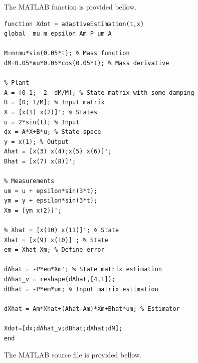 \documentclass[12pt]{article}
\begin{document}
The MATLAB function is provided bellow.
\begin{lstlisting}
function Xdot = adaptiveEstimation(t,x)
global  mu m epsilon Am P um A

M=m+mu*sin(0.05*t); % Mass function
dM=0.05*mu*0.05*cos(0.05*t); % Mass derivative

% Plant
A = [0 1; -2 -dM/M]; % State matrix with some damping
B = [0; 1/M]; % Input matrix
X = [x(1) x(2)]'; % States
u = 2*sin(t); % Input
dx = A*X+B*u; % State space 
y = x(1); % Output
Ahat = [x(3) x(4);x(5) x(6)]'; 
Bhat = [x(7) x(8)]';

% Measurements
um = u + epsilon*sin(3*t);
ym = y + epsilon*sin(3*t);
Xm = [ym x(2)]';

% Xhat = [x(10) x(11)]'; % State 
Xhat = [x(9) x(10)]'; % State 
em = Xhat-Xm; % Define error

dAhat = -P*em*Xm'; % State matrix estimation
dAhat_v = reshape(dAhat,[4,1]);
dBhat = -P*em*um; % Input matrix estimation

dXhat = Am*Xhat+(Ahat-Am)*Xm+Bhat*um; % Estimator

Xdot=[dx;dAhat_v;dBhat;dXhat;dM];
end
\end{lstlisting}
The MATLAB source file is provided bellow.
\end{document}
